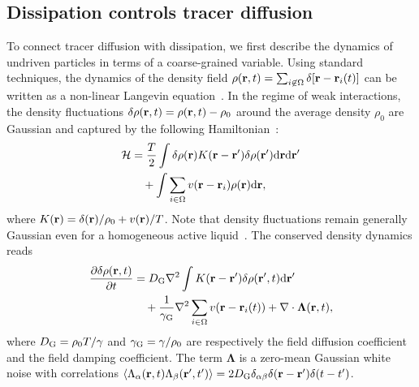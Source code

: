 \documentclass[superscriptaddress, twocolumn, prx, longbibliography, nofootinbib]{revtex4-1}
\newcommand{\dd}{\text{d}}
\begin{document}


\subsection{Dissipation controls tracer diffusion}\label{sec:diff}

To connect tracer diffusion with dissipation, we first describe the dynamics of undriven particles in terms of a coarse-grained variable. Using standard techniques, the dynamics of the density field $\rho({\bf r},t) = \sum_{i\not\in\Omega}\delta[{\bf r}-{\bf r}_i(t)]$ can be written as a non-linear Langevin equation~\cite{Dean1996}. In the regime of weak interactions, the density fluctuations $\delta \rho({\bf r},t ) = \rho({\bf r}, t) - \rho_0$ around the average density $\rho_0$ are Gaussian and captured by the following Hamiltonian~\cite{Chandler1993, Demery2014, Kruger2017}:
\begin{equation}
	\begin{aligned}
		{\cal H} &= \frac{T}{2} \int \delta \rho ({\bf r}) K({\bf r} - {\bf r}') \delta \rho ({\bf r}') \dd{\bf r}\dd{\bf r}'
		\\
		&\quad + \int \sum_{i\in\Omega} v({\bf r}-{\bf r}_i) \rho({\bf r}) \dd{\bf r} ,
	\end{aligned}
\end{equation}
where $K({\bf r})= \delta({\bf r})/\rho_0 + v({\bf r})/T$. Note that density fluctuations remain generally Gaussian even for a homogeneous active liquid~\cite{Fily2012}. The conserved density dynamics reads
\begin{equation}\label{eq:EvolutionField}
	\begin{aligned}
		\frac{\partial \delta \rho({\bf r}, t)}{\partial t} &= D_{\rm G} \nabla^2 \int K({\bf r}-{\bf r}') \delta \rho({\bf r}', t) \dd{\bf r}'
		\\
		&\quad + \frac{1}{\gamma_{\rm G}} \nabla^2 \sum_{i\in\Omega}v({\bf r}-{\bf r}_i(t)) + \nabla \cdot {\boldsymbol\Lambda}({\bf r},t) ,
	\end{aligned}
\end{equation}
where $D_{\rm G} = \rho_0 T/\gamma$ and $\gamma_{\rm G}=\gamma/\rho_0$ are respectively the field diffusion coefficient and the field damping coefficient. The term $\boldsymbol\Lambda$ is a zero-mean Gaussian white noise with correlations $\langle \Lambda_\alpha({\bf r}, t) \Lambda_\beta({\bf r}', t') \rangle = 2 D_{\rm G} \delta_{\alpha\beta}\delta({\bf r} - {\bf r}')\delta(t-t')$.
\end{document}
